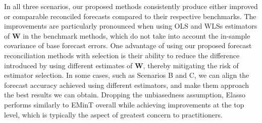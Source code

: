 \documentclass[
  11pt]{article}
\theoremstyle{plain}
\theoremstyle{remark}
\begin{document}
In all three scenarios, our proposed methods consistently produce either
improved or comparable reconciled forecasts compared to their respective
benchmarks. The improvements are particularly pronounced when using OLS
and WLSs estimators of \(\bm{W}\) in the benchmark methods, which do not
take into account the in-sample covariance of base forecast errors. One
advantage of using our proposed forecast reconciliation methods with
selection is their ability to reduce the difference introduced by using
different estimates of \(\bm{W}\), thereby mitigating the risk of
estimator selection. In some cases, such as Scenarios B and C, we can
align the forecast accuracy achieved using different estimators, and
make them approach the best results we can obtain. Dropping the
unbiasedness assumption, Elasso performs similarly to EMinT overall
while achieving improvements at the top level, which is typically the
aspect of greatest concern to practitioners.
\end{document}
